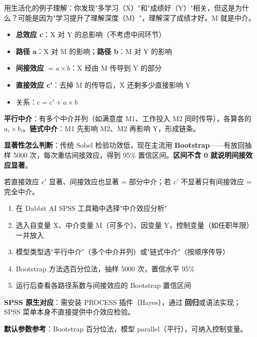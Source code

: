 \begin{algoprinciple}
用生活化的例子理解：你发现"多学习（X）"和"成绩好（Y）"相关，但这是为什么？可能是因为"学习提升了理解深度（M）"，理解深了成绩才好。M 就是中介。

\begin{itemize}
    \item \textbf{总效应 c}：X 对 Y 的总影响（不考虑中间环节）
    \item \textbf{路径 a}：X 对 M 的影响；\textbf{路径 b}：M 对 Y 的影响
    \item \textbf{间接效应} $= a \times b$：X 经由 M 传导到 Y 的部分
    \item \textbf{直接效应 c'}：去掉 M 的传导后，X 还剩多少直接影响 Y
    \item 关系：$c = c' + a \times b$
\end{itemize}

\textbf{平行中介}：有多个中介并列（如满意度 M1、工作投入 M2 同时传导），各算各的 $a_i \times b_i$。\textbf{链式中介}：M1 先影响 M2、M2 再影响 Y，形成链条。

\textbf{显著性怎么判断}：传统 Sobel 检验功效低，现在主流用 \textbf{Bootstrap}——有放回抽样 5000 次，每次重估间接效应，得到 95\% 置信区间。\textbf{区间不含 0 就说明间接效应显著}。

若直接效应 $c'$ 显著、间接效应也显著 = 部分中介；若 $c'$ 不显著只有间接效应 = 完全中介。
\end{algoprinciple}

\begin{algosposs}
\begin{enumerate}
    \item 在 Dabbit AI SPSS 工具箱中选择"中介效应分析"
    \item 选入自变量 X、中介变量 M（可多个）、因变量 Y，控制变量（如任职年限）一并放入
    \item 模型类型选"平行中介"（多个中介并列）或"链式中介"（按顺序传导）
    \item Bootstrap 方法选百分位法，抽样 5000 次，置信水平 95\%
    \item 运行后查看各路径系数与间接效应的 Bootstrap 置信区间
\end{enumerate}

\textbf{SPSS 原生对应}：需安装 PROCESS 插件（Hayes），通过 \textbf{回归}或语法实现；SPSS 菜单本身不直接提供中介效应检验。

\textbf{默认参数参考}：Bootstrap 百分位法，模型 parallel（平行），可纳入控制变量。
\end{algosposs}

